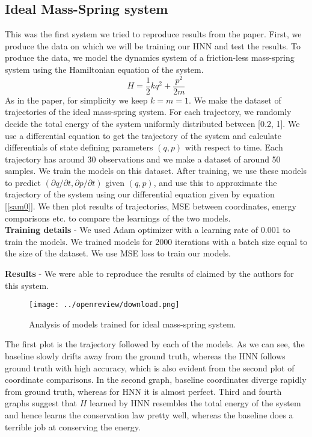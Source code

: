 \subsection{Ideal Mass-Spring system}
This was the first system we tried to reproduce results from the paper. First, we produce the data on which we will be training our HNN and test the results. To produce the data, we model the dynamics system of a friction-less mass-spring system using the Hamiltonian equation of the system.
\begin{equation}
H = \frac{1}{2}kq^2 + \frac{p^2}{2m}
\end{equation}
As in the paper, for simplicity we keep \(k = m = 1\). We make the dataset of trajectories of the ideal mass-spring system. For each trajectory, we randomly decide the total energy of the system uniformly distributed between [0.2, 1]. We use a differential equation to get the trajectory of the system and calculate differentials of state defining parameters \((q, p)\) with respect to time. Each trajectory has around 30 observations and we make a dataset of around 50 samples. We train the models on this dataset. After training, we use these models to predict \((\partial q/\partial t, \partial p/\partial t)\) given \((q, p)\), and use this to approximate the trajectory of the system using our differential equation given by equation [\ref{sam0}]. We then plot results of trajectories, MSE between coordinates, energy comparisons etc. to compare the learnings of the two models.\\
\textbf{Training details} - We used Adam optimizer \cite{kingma2014adam} with a learning rate of 0.001 to train the models. We trained models for 2000 iterations with a batch size equal to the size of the dataset. We use MSE loss to train our models.

\textbf{Results} - We were able to reproduce the results of claimed by the authors for this system.
\begin{figure}[htp]
    \centering
    \texttt{[image: ../openreview/download.png]}
    \caption{Analysis of models trained for ideal mass-spring system.}
    \label{fig:galaxy}
\end{figure}

The first plot is the trajectory followed by each of the models. As we can see, the baseline slowly drifts away from the ground truth, whereas the HNN follows ground truth with high accuracy, which is also evident from the second plot of coordinate comparisons. In the second graph, baseline coordinates diverge rapidly from ground truth, whereas for HNN it is almost perfect. Third and fourth graphs suggest that \(H\) learned by HNN resembles the total energy of the system and hence learns the conservation law pretty well, whereas the baseline does a terrible job at conserving the energy.

